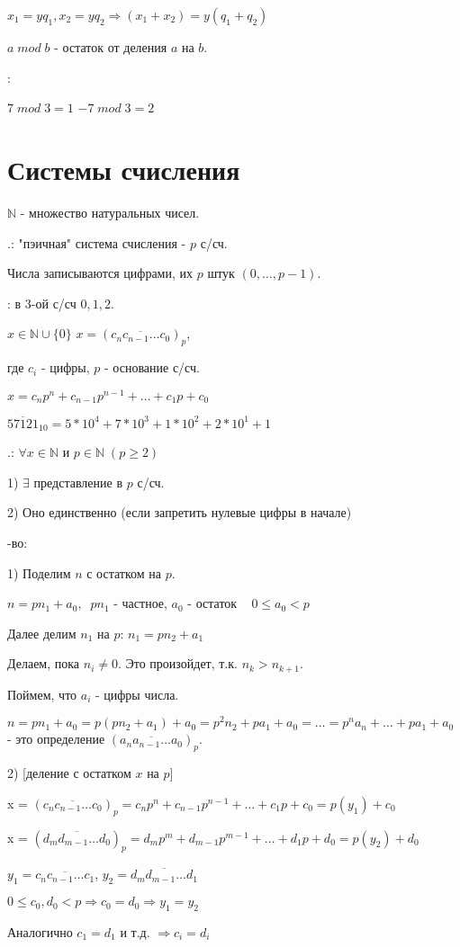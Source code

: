\documentclass{article}
\begin{document}
$x_1 = yq_1, x_2 = yq_2 \Rightarrow (x_1 + x_2) = y(q_1 + q_2)$

 $a \; mod\; b$ - остаток от деления $a$ на $b$.

:

$7 \; mod\; 3 = 1$ \hspace{10pt} $-7 \; mod \; 3 = 2$

\section{Системы счисления}

\noindent$\mathbb{N}$ - множество натуральных чисел.

.: "пэичная" система счисления - $p$ с/сч.

Числа записываются цифрами, их $p$ штук $(0, \dotsc, p-1)$.

: в $3$-ой с/сч $0,1,2$.

 $x \in \mathbb{N} \cup \{0\}$ \hspace{20pt} $x = (\overline{c_nc_{n-1}\dotsc c_0})_p$,

где $c_i$ - цифры, $p$ - основание с/сч.

$x = c_n p^n + c_{n-1}p^{n-1} + \dotsc + c_1 p + c_0$

$\overline{57121}_{10} = 5*10^4 + 7*10^3 + 1*10^2 + 2*10^1 + 1$

.: $\forall x \in \mathbb{N}$ и $p\in \mathbb{N} \; (p\geq 2)$

1) $\exists$ \Russian представление в $p$ с/сч.

2) Оно единственно (если запретить нулевые цифры в начале)

-во: 

1) Поделим $n$ с остатком на $p$.

$n = pn_1 + a_0, \;\; pn_1$ - частное, $a_0$ - остаток $\;\;\; 0\leq a_0 < p$

Далее делим $n_1$ на $p$: $n_1 = pn_2 + a_1$

Делаем, пока $n_i\neq 0$. Это произойдет, т.к. $n_k > n_{k+1}$.

Поймем, что $a_i$ \Russian - цифры числа.

$n = pn_1 + a_0 = p(pn_2 + a_1) + a_0 = p^2n_2 + pa_1 + a_0 = \dotsc = p^na_n + \dotsc + pa_1 + a_0$ - это определение $(\overline{a_na_{n-1}\dotsc a_0})_p$.

\;

2) [деление с остатком $x$ на $p$]

x = $(\overline{c_nc_{n-1}\dotsc c_0})_p = c_n p^n + c_{n-1}p^{n-1} + \dotsc + c_1 p + c_0 = p(y_1) + c_0$

x = $(\overline{d_md_{m-1}\dotsc d_0})_p = d_m p^m + d_{m-1}p^{m-1} + \dotsc + d_1 p + d_0 = p(y_2) + d_0$

$y_1 = \overline{c_nc_{n-1} \dotsc c_1}$,\;\;
$y_2 = \overline{d_md_{m-1}\dotsc d_1}$

$0\leq c_0, d_0 < p \Rightarrow c_0 = d_0 \Rightarrow y_1 = y_2$

Аналогично $c_1 = d_1$ и т.д. $\Rightarrow c_i = d_i$
\end{document}
